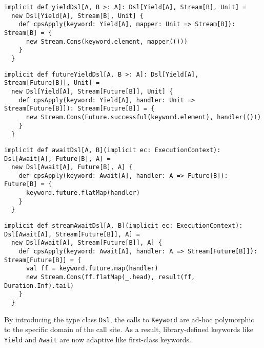\begin{lstlisting}[caption={The \lstinline{Dsl} type class instance of \lstinline{Yield} for creating generators},label={Yield-generator-instance}]
implicit def yieldDsl[A, B >: A]: Dsl[Yield[A], Stream[B], Unit] =
  new Dsl[Yield[A], Stream[B], Unit] {
    def cpsApply(keyword: Yield[A], mapper: Unit => Stream[B]): Stream[B] = {
      new Stream.Cons(keyword.element, mapper(()))
    }
  }
\end{lstlisting}

\begin{lstlisting}[caption={The \lstinline{Dsl} type class instance of \lstinline{Yield} for creating asynchronous generators},label={Yield-async-generator-instance}]
implicit def futureYieldDsl[A, B >: A]: Dsl[Yield[A], Stream[Future[B]], Unit] =
  new Dsl[Yield[A], Stream[Future[B]], Unit] {
    def cpsApply(keyword: Yield[A], handler: Unit => Stream[Future[B]]): Stream[Future[B]] = {
      new Stream.Cons(Future.successful(keyword.element), handler(()))
    }
  }
\end{lstlisting}

\begin{lstlisting}[caption={The \lstinline{Dsl} type class instance of \lstinline{Await} for creating asynchronous values},label={Await-future-instance}]
implicit def awaitDsl[A, B](implicit ec: ExecutionContext): Dsl[Await[A], Future[B], A] =
  new Dsl[Await[A], Future[B], A] {
    def cpsApply(keyword: Await[A], handler: A => Future[B]): Future[B] = {
      keyword.future.flatMap(handler)
    }
  }
\end{lstlisting}

\begin{lstlisting}[caption={The \lstinline{Dsl} type class instance of \lstinline{Await} for creating asynchronous generators},label={Await-async-generator-instance}]
implicit def streamAwaitDsl[A, B](implicit ec: ExecutionContext): Dsl[Await[A], Stream[Future[B]], A] =
  new Dsl[Await[A], Stream[Future[B]], A] {
    def cpsApply(keyword: Await[A], handler: A => Stream[Future[B]]): Stream[Future[B]] = {
      val ff = keyword.future.map(handler)
      new Stream.Cons(ff.flatMap(_.head), result(ff, Duration.Inf).tail)
    }
  }
\end{lstlisting}

By introducing the type class \lstinline{Dsl}, the calls to \lstinline{Keyword} are ad-hoc polymorphic to the specific domain of the call site. As a result, library-defined keywords like \lstinline{Yield} and \lstinline{Await} are now adaptive like first-class keywords.

